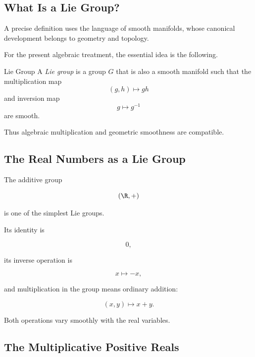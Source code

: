 \subsection{What Is a Lie Group?}
\label{subsec:lie-group-definition}

A precise definition uses the language of smooth manifolds, whose canonical
development belongs to geometry and topology.

For the present algebraic treatment, the essential idea is the following.

\begin{definitionbox}{Lie Group}
A \emph{Lie group} is a group \(G\) that is also a smooth manifold such that
the multiplication map
\[ (g,h)\longmapsto gh \]
and inversion map
\[ g\longmapsto g^{-1} \]
are smooth.
\end{definitionbox}

Thus algebraic multiplication and geometric smoothness are compatible.

\subsection{The Real Numbers as a Lie Group}
\label{subsec:real-line-lie-group}

The additive group

\[ (\R,+) \]

is one of the simplest Lie groups.

Its identity is

\[ 0, \]

its inverse operation is

\[ x\mapsto -x, \]

and multiplication in the group means ordinary addition:

\[ (x,y)\mapsto x+y. \]

Both operations vary smoothly with the real variables.

\subsection{The Multiplicative Positive Reals}
\label{subsec:positive-reals-lie-group}

